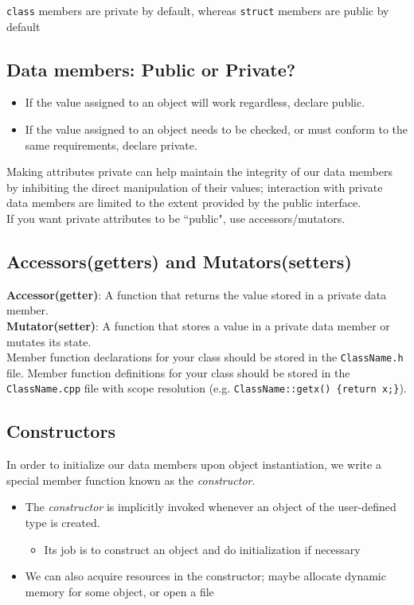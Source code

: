 \documentclass{article}
\begin{document}
	\verb|class| members are private by default, whereas \verb|struct| members are public by default
	
	
	\subsection*{Data members: Public or Private?}
	\begin{itemize}
		\item If the value assigned to an object will work regardless, declare public.
		\item If the value assigned to an object needs to be checked, or must conform to the same requirements, declare private.
	\end{itemize}
	
	Making attributes private can help maintain the integrity of our data members by inhibiting the direct manipulation of their values; interaction with private data members are limited to the extent provided by the public interface.\\
	
	If you want private attributes to be ``public", use accessors/mutators.
	
	
	\subsection{Accessors(getters) and Mutators(setters)}
	
	\textbf{Accessor(getter)}: A function that returns the value stored in a private data member.\\
	
	\textbf{Mutator(setter)}: A function that stores a value in a private data member or mutates its state.\\
	
	Member function declarations for your class should be stored in the \verb|ClassName.h| file. Member function definitions for your class should be stored in the \verb|ClassName.cpp| file with scope resolution (e.g. \verb|ClassName::getx() {return x;}|).
	
	
	\subsection{Constructors}
	
	In order to initialize our data members upon object instantiation, we write a special member function known as the \textit{constructor}.
	\begin{itemize}
		\item The \textit{constructor} is implicitly invoked whenever an object of the user-defined type is created.
			\begin{itemize}
				\item Its job is to construct an object and do initialization if necessary
			\end{itemize}
		\item We can also acquire resources in the constructor; maybe allocate dynamic memory for some object, or open a file
	\end{itemize}
\end{document}
